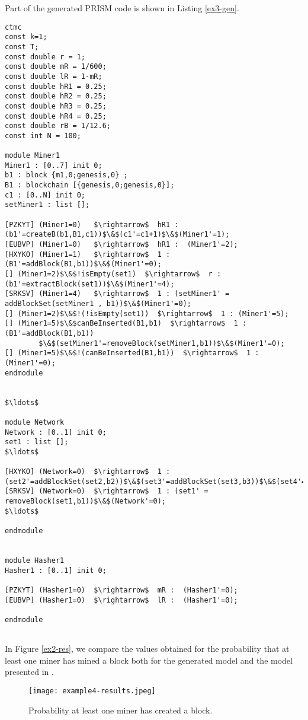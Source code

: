 Part of the generated PRISM code is shown in Listing \ref{ex3-gen}. 
\begin{lstlisting}[style=prism-color,caption={Generated PRISM program for the Peer-To-Peer Protocol.},captionpos=b,label={ex3-gen}]
ctmc
const k=1;
const T;
const double r = 1;
const double mR = 1/600;
const double lR = 1-mR;
const double hR1 = 0.25;
const double hR2 = 0.25;
const double hR3 = 0.25;
const double hR4 = 0.25;
const double rB = 1/12.6;
const int N = 100;

module Miner1
Miner1 : [0..7] init 0;
b1 : block {m1,0;genesis,0} ; 
B1 : blockchain [{genesis,0;genesis,0}]; 
c1 : [0..N] init 0; 
setMiner1 : list []; 

[PZKYT] (Miner1=0)   $\rightarrow$  hR1 : (b1'=createB(b1,B1,c1))$\&$(c1'=c1+1)$\&$(Miner1'=1); 
[EUBVP] (Miner1=0)   $\rightarrow$  hR1 :  (Miner1'=2); 
[HXYKO] (Miner1=1)   $\rightarrow$  1 : (B1'=addBlock(B1,b1))$\&$(Miner1'=0); 
[] (Miner1=2)$\&$!isEmpty(set1)  $\rightarrow$  r : (b1'=extractBlock(set1))$\&$(Miner1'=4); 
[SRKSV] (Miner1=4)   $\rightarrow$  1 : (setMiner1' = addBlockSet(setMiner1 , b1))$\&$(Miner1'=0); 
[] (Miner1=2)$\&$!(!isEmpty(set1))  $\rightarrow$  1 : (Miner1'=5); 
[] (Miner1=5)$\&$canBeInserted(B1,b1)  $\rightarrow$  1 : (B1'=addBlock(B1,b1))
		$\&$(setMiner1'=removeBlock(setMiner1,b1))$\&$(Miner1'=0); 
[] (Miner1=5)$\&$!(canBeInserted(B1,b1))  $\rightarrow$  1 : (Miner1'=0);
endmodule


$\ldots$

module Network
Network : [0..1] init 0;
set1 : list []; 
$\ldots$

[HXYKO] (Network=0)  $\rightarrow$  1 : (set2'=addBlockSet(set2,b2))$\&$(set3'=addBlockSet(set3,b3))$\&$(set4'=addBlockSet(set4,b4))$\&$(Network'=0); 
[SRKSV] (Network=0)  $\rightarrow$  1 : (set1' = removeBlock(set1,b1))$\&$(Network'=0); 
$\ldots$

endmodule


module Hasher1
Hasher1 : [0..1] init 0;

[PZKYT] (Hasher1=0)  $\rightarrow$  mR :  (Hasher1'=0); 
[EUBVP] (Hasher1=0)  $\rightarrow$  lR :  (Hasher1'=0); 

endmodule


\end{lstlisting}


In Figure \ref{ex2-res}, we compare the values obtained for the probability that at least one miner has mined a block both for the generated model and the model presented in \cite{DBLP:journals/concurrency/BistarelliNGLMV23}.
\begin{figure}[h]
\centering
\texttt{[image: example4-results.jpeg]}	
\caption{Probability at least one miner has created a block.}
\label{ex3-res}
\end{figure}

